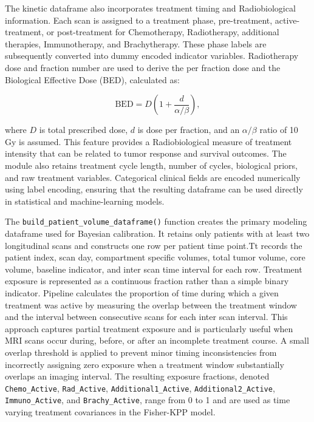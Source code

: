 The kinetic dataframe also incorporates treatment timing and Radiobiological information. Each scan is assigned to a treatment phase, pre-treatment, active-treatment, or post-treatment for Chemotherapy, Radiotherapy, additional therapies, Immunotherapy, and Brachytherapy. These phase labels are subsequently converted into dummy encoded indicator variables. Radiotherapy dose and fraction number are used to derive the per fraction dose and the Biological Effective Dose (BED), calculated as:

\begin{equation}
\mathrm{BED}=D\left(1+\frac{d}{\alpha/\beta}\right),
\end{equation}

where $D$ is total prescribed dose, $d$ is dose per fraction, and an $\alpha/\beta$ ratio of 10 Gy is assumed. This feature provides a Radiobiological measure of treatment intensity that can be related to tumor response and survival outcomes. The module also retains treatment cycle length, number of cycles, biological priors, and raw treatment variables. Categorical clinical fields are encoded numerically using label encoding, ensuring that the resulting dataframe can be used directly in statistical and machine-learning models.

The \texttt{build\_patient\_volume\_dataframe()} function creates the primary modeling dataframe used for Bayesian calibration. It retains only patients with at least two longitudinal scans and constructs one row per patient time point.Tt records the patient index, scan day, compartment specific volumes, total tumor volume, core volume, baseline indicator, and inter scan time interval for each row. Treatment exposure is represented as a continuous fraction rather than a simple binary indicator. Pipeline calculates the proportion of time during which a given treatment was active by measuring the overlap between the treatment window and the interval between consecutive scans for each inter scan interval. This approach captures partial treatment exposure and is particularly useful when MRI scans occur during, before, or after an incomplete treatment course. A small overlap threshold is applied to prevent minor timing inconsistencies from incorrectly assigning zero exposure when a treatment window substantially overlaps an imaging interval. The resulting exposure fractions, denoted \texttt{Chemo\_Active}, \texttt{Rad\_Active}, \texttt{Additional1\_Active}, \texttt{Additional2\_Active}, \texttt{Immuno\_Active}, and \texttt{Brachy\_Active}, range from 0 to 1 and are used as time varying treatment covariances in the Fisher-KPP model.

